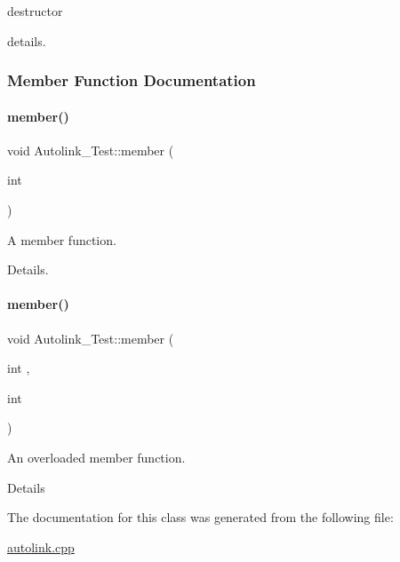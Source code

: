 destructor 

details. 

\subsubsection{Member Function Documentation}
\mbox{\label{class_autolink___test_a393ea281f235a2f603d98daf72b0d411}} 
\paragraph{\texorpdfstring{member()}{member()}\hspace{0.1cm}{\footnotesize\ttfamily [1/2]}}
{\footnotesize\ttfamily void Autolink\+\_\+\+Test\+::member (\begin{DoxyParamCaption}\item[{int}]{ }\end{DoxyParamCaption})}



A member function. 

Details. \mbox{\label{class_autolink___test_acf783a43c2b4b6cc9dd2361784eca2e1}} 
\paragraph{\texorpdfstring{member()}{member()}\hspace{0.1cm}{\footnotesize\ttfamily [2/2]}}
{\footnotesize\ttfamily void Autolink\+\_\+\+Test\+::member (\begin{DoxyParamCaption}\item[{int}]{,  }\item[{int}]{ }\end{DoxyParamCaption})}



An overloaded member function. 

Details 

The documentation for this class was generated from the following file\+:\begin{DoxyCompactItemize}
\item 
\mbox{\hyperlink{autolink_8cpp}{autolink.\+cpp}}\end{DoxyCompactItemize}
